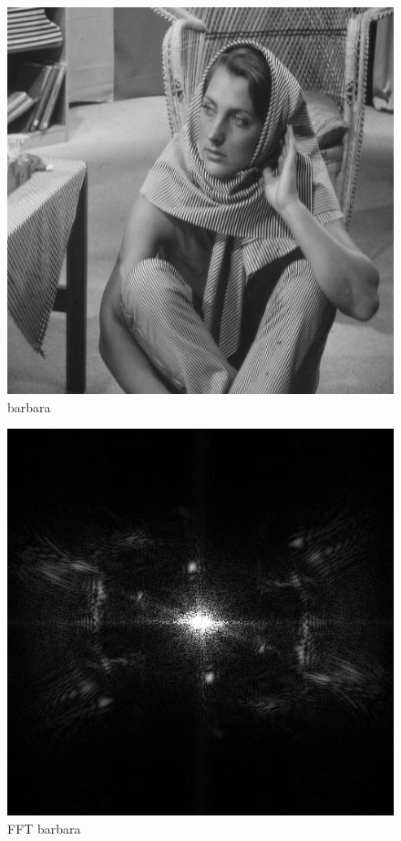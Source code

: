 \documentclass{article}
\begin{document}
\begin{figure}
	\begin{center}
		\includegraphics[scale=0.4]{barbara_512}\\
		barbara
	\end{center}
\end{figure}
\begin{figure}
	\begin{center}
		\includegraphics[scale=0.4]{barbara_FFT}\\
		FFT barbara
	\end{center}
\end{figure}
\end{document}
